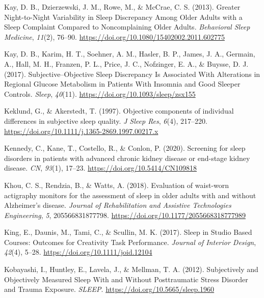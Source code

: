 \documentclass[
]{article}
\newlength{\cslhangindent}
\newenvironment{CSLReferences}[2] %
 {\begin{list}{}{%
  \setlength{\itemindent}{0pt}
  \setlength{\leftmargin}{0pt}
  \setlength{\parsep}{0pt}
  \ifodd #1
   \setlength{\leftmargin}{\cslhangindent}
   \setlength{\itemindent}{-1\cslhangindent}
  \fi
  \setlength{\itemsep}{#2\baselineskip}}}
 {\end{list}}
\begin{document}
\begin{CSLReferences}{1}{0}
Kay, D. B., Dzierzewski, J. M., Rowe, M., \& McCrae, C. S. (2013). Greater {Night}-to-{Night} {Variability} in {Sleep} {Discrepancy} {Among} {Older} {Adults} with a {Sleep} {Complaint} {Compared} to {Noncomplaining} {Older} {Adults}. \emph{Behavioral Sleep Medicine}, \emph{11}(2), 76--90. \url{https://doi.org/10.1080/15402002.2011.602775}

Kay, D. B., Karim, H. T., Soehner, A. M., Hasler, B. P., James, J. A., Germain, A., Hall, M. H., Franzen, P. L., Price, J. C., Nofzinger, E. A., \& Buysse, D. J. (2017). Subjective--{Objective} {Sleep} {Discrepancy} {Is} {Associated} {With} {Alterations} in {Regional} {Glucose} {Metabolism} in {Patients} {With} {Insomnia} and {Good} {Sleeper} {Controls}. \emph{Sleep}, \emph{40}(11). \url{https://doi.org/10.1093/sleep/zsx155}

Keklund, G., \& Akerstedt, T. (1997). Objective components of individual differences in subjective sleep quality. \emph{J Sleep Res}, \emph{6}(4), 217--220. \url{https://doi.org/10.1111/j.1365-2869.1997.00217.x}

Kennedy, C., Kane, T., Costello, R., \& Conlon, P. (2020). Screening for sleep disorders in patients with advanced chronic kidney disease or end-stage kidney disease. \emph{CN}, \emph{93}(1), 17--23. \url{https://doi.org/10.5414/CN109818}

Khou, C. S., Rendzia, B., \& Watts, A. (2018). Evaluation of waist-worn actigraphy monitors for the assessment of sleep in older adults with and without {Alzheimer}'s disease. \emph{Journal of Rehabilitation and Assistive Technologies Engineering}, \emph{5}, 205566831877798. \url{https://doi.org/10.1177/2055668318777989}

King, E., Daunis, M., Tami, C., \& Scullin, M. K. (2017). Sleep in {Studio} {Based} {Courses}: {Outcomes} for {Creativity} {Task} {Performance}. \emph{Journal of Interior Design}, \emph{42}(4), 5--28. \url{https://doi.org/10.1111/joid.12104}

Kobayashi, I., Huntley, E., Lavela, J., \& Mellman, T. A. (2012). Subjectively and {Objectively} {Measured} {Sleep} {With} and {Without} {Posttraumatic} {Stress} {Disorder} and {Trauma} {Exposure}. \emph{SLEEP}. \url{https://doi.org/10.5665/sleep.1960}


\end{CSLReferences}
\end{document}
